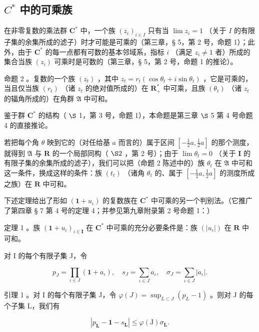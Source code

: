 \subsection{\texorpdfstring{\(C^*\) 中的可乘族}{复数乘法群中的可乘族}}

在非零复数的乘法群 \(\mathbf{C}^*\) 中，一个族 \((z_{i})_{i\in I}\) 只有当 \(\lim z_{i} = 1\) （关于 \(I\) 的有限子集的余集所成的滤子）时才可能是可乘的（第三章，§ 5，第 2 号，命题 1）；此外，由于 \(\mathbf{C}^*\) 的每一点都有可数的基本邻域系，指标 \(i\) （满足 \(z_{i}\neq 1\) 者）所成的集合当族 \((z_{i})\) 可乘时是可数的（第三章，§ 5，第 2 号，命题 1 的推论）。

命题 2 。复数的一个族 \((z_{t})\) ，其中 \(z_{t} = r_{t}(\cos \theta_{t} + i\sin \theta_{t})\) ，它是可乘的，当且仅当族 \((r_{t})\) （诸 \(z_{t}\) 的绝对值所成的）在 \(\mathbf{R}_{+}^{*}\) 中可乘，且族 \((\theta_{t})\) （诸 \(z_{t}\) 的辐角所成的）在角群 \(\mathfrak{A}\) 中可和。

鉴于群 \(\mathbf{C}^*\) 的结构（ \(\S\) 1，第 3 号，命题 1），本命题是第三章 \(\S\) 5 第 4 号命题 4 的直接推论。

若把每个角 \(\theta\) 映到它的（对任给基 \(a\) 而言的）属于区间 \([- \frac{1}{2} a, \frac{1}{2} a]\) 的那个测度，就得到 \(\mathfrak{A}\) 与 \(\mathbf{R}\) 的一个局部同构（ \(\S 2\) ，第 2 号）；由于 \(\lim \theta_{t} = 0\) （关于 \(\mathbf{I}\) 的有限子集的余集所成的滤子），我们可以把（命题 2 陈述中的）族 \(\theta_t\) 在 \(\mathfrak{A}\) 中可和这一条件，换成这样的条件：族 \((t_t)\) （诸角 \(\theta_t\) 的、属于 \([- \frac{1}{2} a, \frac{1}{2} a]\) 的测度所成之族）在 \(\mathbf{R}\) 中可和。

下述定理给出了形如 \((\mathbf{1} + u_{\iota})\) 的复数族在 \(\mathbf{C}^*\) 中可乘的另一个判别法。（它推广了第四章 § 7 第 4 号的定理 4；并参见第九章附录第 2 号命题 1：）

定理 1 。族 \((\mathbf{1} + u_{\iota})_{\iota \in \mathbf{I}}\) 在 \(\mathbf{C}^*\) 中可乘的充分必要条件是：族 \((|u_{\iota}|)\) 在 \(\mathbf{R}\) 中可和。

对 I 的每个有限子集 J，令

\[
p _ {J} = \prod_ {\iota \in J} (\mathbf{1} + a _ {\iota}), \quad s _ {J} = \sum_ {\iota \in J} a _ {\iota}, \quad \sigma_ {J} = \sum_ {\iota \in J} | a _ {\iota} |.
\]

引理 1 。对 I 的每个有限子集 J，令 \(\varphi(J) = \sup_{L \subset J} (p_L - 1)\) 。则对 J 的每个子集 L，我们有

\[
\left| p _ {\mathbf {L}} - \mathbf {1} - s _ {\mathbf {L}} \right| \leqslant \varphi (\mathrm{J}) \sigma_ {\mathbf {L}}.\tag{2}
\]

